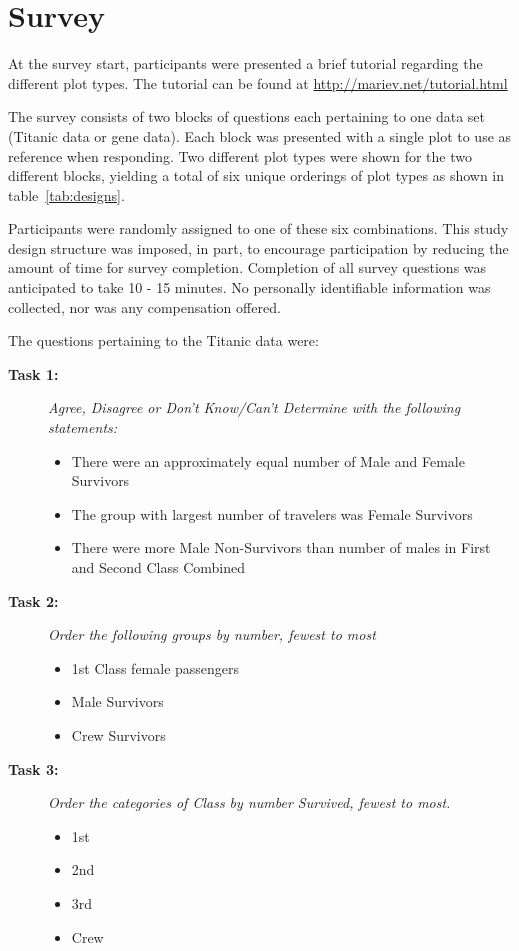 \documentclass[journal]{vgtc}\usepackage{graphicx, color}
\begin{document}
\appendices
\section{Survey }\label{app2}

At the survey start, participants were presented a brief tutorial regarding the different plot types. The tutorial can be found at \url{http://mariev.net/tutorial.html}

The survey consists of two blocks of questions each pertaining to one data set (Titanic data or gene data). Each block was presented with a single plot  to use as reference when responding. Two different plot types were shown for the two different blocks, yielding a total of six unique orderings of plot types as shown in table~\ref{tab:designs}.

Participants were randomly assigned to one of these six combinations.  This study design structure was imposed, in part,  to encourage participation by reducing the amount of time for survey completion. Completion of all survey questions was anticipated to take 10 - 15 minutes.
No personally identifiable information was collected, nor was any compensation offered.   

\noindent The questions pertaining to the Titanic data were: 
\begin{description}
\item[\bf Task 1: ]\emph{ Agree, Disagree or Don't Know/Can't Determine with the following statements:}
\begin{itemize}
\item There were an approximately equal number of Male and Female Survivors
\item The group with largest number of travelers was Female Survivors
\item There were more Male Non-Survivors than number of males in First and Second Class Combined
\end{itemize}

\item[\bf Task 2: ]\emph{ Order the following groups by number, fewest to most}
\begin{itemize}
\item 1st Class female passengers
\item Male Survivors
\item Crew Survivors
\end{itemize}

\item[\bf Task 3: ]\emph{ Order the categories of Class by number Survived, fewest to most.} 
\begin{itemize}
\item 1st
\item 2nd 
\item 3rd
\item Crew
\end{itemize}
\end{description}
\end{document}
